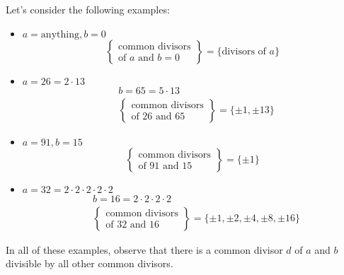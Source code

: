 \documentclass[11pt, draft]{article}
\begin{document}
\begin{example}
    Let's consider the following examples:
    \begin{itemize}
        \item \(a = \text{anything}, b = 0\)
              \[
                  \left\{
                  \begin{array}{l}
                      \text{common divisors} \\
                      \text{of } a \text{ and } b = 0
                  \end{array}
                  \right\} = \{ \text{divisors of } a \}
              \]

        \item \(a = 26 = 2 \cdot 13\)
              \[
                  \begin{aligned}
                       & b = 65 = 5 \cdot 13 \\
                       & \left\{
                      \begin{array}{l}
                          \text{common divisors} \\
                          \text{of } 26 \text{ and } 65
                      \end{array}
                      \right\} = \{ \pm 1, \pm 13 \}
                  \end{aligned}
              \]

        \item \(a = 91, b = 15\)
              \[
                  \left\{
                  \begin{array}{l}
                      \text{common divisors} \\
                      \text{of } 91 \text{ and } 15
                  \end{array}
                  \right\} = \{ \pm 1 \}
              \]

        \item \(a = 32 = 2 \cdot 2 \cdot 2 \cdot 2 \cdot 2\)
              \[
                  \begin{aligned}
                       & b = 16 = 2 \cdot 2 \cdot 2 \cdot 2 \\
                       & \left\{
                      \begin{array}{l}
                          \text{common divisors} \\
                          \text{of } 32 \text{ and } 16
                      \end{array}
                      \right\} = \{ \pm 1, \pm 2, \pm 4, \pm 8, \pm 16 \}
                  \end{aligned}
              \]
    \end{itemize}

    In all of these examples, observe that there is a common divisor \(d\) of \(a\)
    and \(b\) divisible by all other common divisors.
\end{example}
\end{document}
